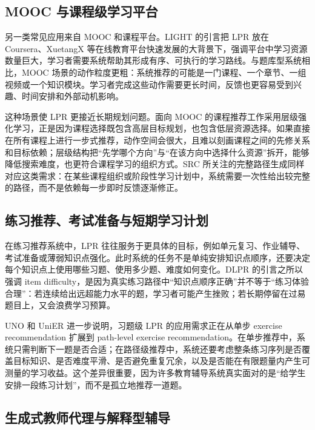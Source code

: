 \documentclass[UTF8,a4paper,zihao=-4]{ctexart}
\begin{document}
\subsection{MOOC 与课程级学习平台}

另一类常见应用来自 MOOC 和课程平台。LIGHT 的引言把 LPR 放在 Coursera、XuetangX 等在线教育平台快速发展的大背景下，强调平台中学习资源数量巨大，学习者需要系统帮助其形成有序、可执行的学习路线\cite{Yu2025LIGHT}。与题库型系统相比，MOOC 场景的动作粒度更粗：系统推荐的可能是一门课程、一个章节、一组视频或一个知识模块。学习者完成这些动作需要更长时间，反馈也更容易受到兴趣、时间安排和外部动机影响。

这种场景使 LPR 更接近长期规划问题。面向 MOOC 的课程推荐工作采用层级强化学习，正是因为课程选择既包含高层目标规划，也包含低层资源选择\cite{Zhang2019MOOC}。如果直接在所有课程上进行一步式推荐，动作空间会很大，且难以刻画课程之间的先修关系和目标依赖；层级结构把“先学哪个方向”与“在该方向中选择什么资源”拆开，能够降低搜索难度，也更符合课程学习的组织方式。SRC 所关注的完整路径生成同样对应这类需求：在某些课程组织或阶段性学习计划中，系统需要一次性给出较完整的路径，而不是依赖每一步即时反馈逐渐修正\cite{Chen2023SRC}。

\subsection{练习推荐、考试准备与短期学习计划}

在练习推荐系统中，LPR 往往服务于更具体的目标，例如单元复习、作业辅导、考试准备或薄弱知识点强化。此时系统的任务不是单纯安排知识点顺序，还要决定每个知识点上使用哪些习题、使用多少题、难度如何变化。DLPR 的引言之所以强调 item difficulty，是因为真实练习路径中“知识点顺序正确”并不等于“练习体验合理”：若连续给出远超能力水平的题，学习者可能产生挫败；若长期停留在过易题目上，又会浪费学习预算\cite{Zhang2024DLPR}。

UNO 和 UniER 进一步说明，习题级 LPR 的应用需求正在从单步 exercise recommendation 扩展到 path-level exercise recommendation\cite{Peng2026UNO,Cheng2026UniER}。在单步推荐中，系统只需判断下一题是否合适；在路径级推荐中，系统还要考虑整条练习序列是否覆盖目标知识、是否难度平滑、是否避免重复冗余，以及是否能在有限题量内产生可测量的学习收益。这个差异很重要，因为许多教育辅导系统真实面对的是“给学生安排一段练习计划”，而不是孤立地推荐一道题。

\subsection{生成式教师代理与解释型辅导}
\end{document}

